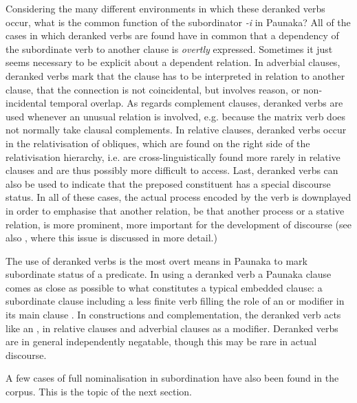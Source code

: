 Considering the many different environments in which these deranked verbs occur, what is the common function of the subordinator \textit{-i} in Paunaka? All of the cases in which deranked verbs are found have in common that a dependency of the subordinate verb to another clause is \textit{overtly} expressed. Sometimes it just seems necessary to be explicit about a dependent relation. In adverbial clauses, deranked verbs mark that the clause has to be interpreted in relation to another clause, that the connection is not coincidental, but involves reason,  or non-incidental temporal overlap. As regards complement clauses, deranked verbs are used whenever an unusual relation is involved, e.g. because the matrix verb does not normally take clausal complements. In relative clauses, deranked verbs occur in the relativisation of obliques, which are found on the right side of the relativisation hierarchy, i.e. are cross-linguistically found more rarely in relative clauses and are thus possibly more difficult to access. Last, deranked verbs can also be used to indicate that the preposed constituent has a special discourse status. In all of these cases, the actual process encoded by the verb is downplayed in order to emphasise that another relation, be that another process or a stative relation, is more prominent, more important for the development of discourse (see also , where this issue is discussed in more detail.)

The use of deranked verbs is the most overt means in Paunaka to mark subordinate status of a predicate. In using a deranked verb a Paunaka clause comes as close as possible to what constitutes a typical embedded clause: a subordinate clause including a less finite verb filling the role of an  or modifier in its main clause \citep[cf.][184]{Lehmann1988}. In  constructions and complementation, the deranked verb acts like an , in relative clauses and adverbial clauses as a modifier. Deranked verbs are in general independently negatable, though this may be rare in actual discourse.

A few cases of full nominalisation in subordination have also been found in the corpus. This is the topic of the next section.

